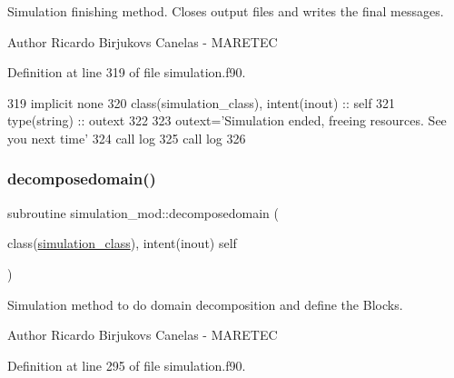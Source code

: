 Simulation finishing method. Closes output files and writes the final messages. 

\begin{DoxyAuthor}{Author}
Ricardo Birjukovs Canelas -\/ M\+A\+R\+E\+T\+EC 
\end{DoxyAuthor}


Definition at line 319 of file simulation.\+f90.


\begin{DoxyCode}
319     \textcolor{keywordtype}{implicit none}
320     \textcolor{keywordtype}{class}(simulation\_class), \textcolor{keywordtype}{intent(inout)} :: self
321     \textcolor{keywordtype}{type}(string) :: outext
322 
323     outext=\textcolor{stringliteral}{'Simulation ended, freeing resources. See you next time'}
324     \textcolor{keyword}{call }log%
325     \textcolor{keyword}{call }log%
326 
\end{DoxyCode}
\mbox{\label{namespacesimulation__mod_a2b8198a9fb3f7671c6b45192a0b9740c}} 
\subsubsection{\texorpdfstring{decomposedomain()}{decomposedomain()}}
{\footnotesize\ttfamily subroutine simulation\+\_\+mod\+::decomposedomain (\begin{DoxyParamCaption}\item[{class(\mbox{\hyperlink{structsimulation__mod_1_1simulation__class}{simulation\+\_\+class}}), intent(inout)}]{self }\end{DoxyParamCaption})\hspace{0.3cm}{\ttfamily [private]}}



Simulation method to do domain decomposition and define the Blocks. 

\begin{DoxyAuthor}{Author}
Ricardo Birjukovs Canelas -\/ M\+A\+R\+E\+T\+EC 
\end{DoxyAuthor}


Definition at line 295 of file simulation.\+f90.


